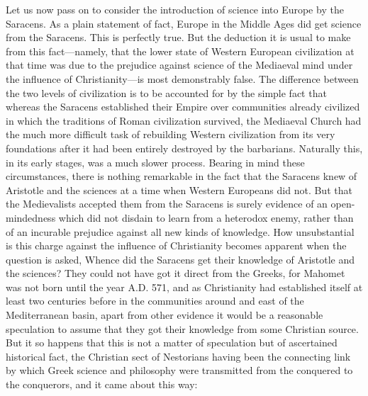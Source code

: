 \documentclass{book}
\begin{document}
Let us now pass on to consider the introduction of science into Europe by the Saracens. As a plain statement of fact, Europe in the Middle Ages did get science from the Saracens. This is perfectly true. But the deduction it is usual to make from this fact—namely, that the lower state of Western European civilization at that time was due to the prejudice against science of the Mediaeval mind under the influence of Christianity—is most demonstrably false. The difference between the two levels of civilization is to be accounted for by the simple fact that whereas the Saracens established their Empire over communities already civilized in which the traditions of Roman civilization survived, the Mediaeval Church had the much more difficult task of rebuilding Western civilization from its very foundations after it had been entirely destroyed by the barbarians. Naturally this, in its early stages, was a much slower process. Bearing in mind these circumstances, there is nothing remarkable in the fact that the Saracens knew of Aristotle and the sciences at a time when Western Europeans did not. But that the Medievalists accepted them from the Saracens is surely evidence of an open-mindedness which did not disdain to learn from a heterodox enemy, rather than of an incurable prejudice against all new kinds of knowledge. How unsubstantial is this charge against the influence of Christianity becomes apparent when the question is asked, Whence did the Saracens get their knowledge of Aristotle and the sciences? They could not have got it direct from the Greeks, for Mahomet was not born until the year A.D. 571, and as Christianity had established itself at least two centuries before in the communities around and east of the Mediterranean basin, apart from other evidence it would be a reasonable speculation to assume that they got their knowledge from some Christian source. But it so happens that this is not a matter of speculation but of ascertained historical fact, the Christian sect of Nestorians having been the connecting link by which Greek science and philosophy were transmitted from the conquered to the conquerors, and it came about this way:
\end{document}
